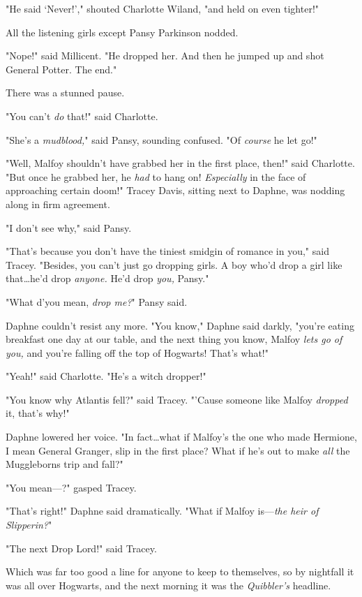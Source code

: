 "He said `Never!'," shouted Charlotte Wiland, "and held on even tighter!"

All the listening girls except Pansy Parkinson nodded.

"Nope!" said Millicent. "He dropped her. And then he jumped up and shot General
Potter. The end."

There was a stunned pause.

"You can't \emph{do} that!" said Charlotte.

"She's a \emph{mudblood,}" said Pansy, sounding confused. "Of \emph{course} he
let go!"

"Well, Malfoy shouldn't have grabbed her in the first place, then!" said
Charlotte. "But once he grabbed her, he \emph{had} to hang on!
\emph{Especially} in the face of approaching certain doom!" Tracey Davis,
sitting next to Daphne, was nodding along in firm agreement.

"I don't see why," said Pansy.

"That's because you don't have the tiniest smidgin of romance in you," said
Tracey. "Besides, you can't just go dropping girls. A boy who'd drop a girl
like that…he'd drop \emph{anyone.} He'd drop \emph{you,} Pansy."

"What d'you mean, \emph{drop me?}" Pansy said.

Daphne couldn't resist any more. "You know," Daphne said darkly, "you're eating
breakfast one day at our table, and the next thing you know, Malfoy \emph{lets
go of you,} and you're falling off the top of Hogwarts! That's what!"

"Yeah!" said Charlotte. "He's a witch dropper!"

"You know why Atlantis fell?" said Tracey. "'Cause someone like Malfoy
\emph{dropped} it, that's why!"

Daphne lowered her voice. "In fact…what if Malfoy's the one who made
Hermione, I mean General Granger, slip in the first place? What if he's out to
make \emph{all} the Muggleborns trip and fall?"

"You mean---?" gasped Tracey.

"That's right!" Daphne said dramatically. "What if Malfoy is---\emph{the heir
of Slipperin?}"

"The next Drop Lord!" said Tracey.

Which was far too good a line for anyone to keep to themselves, so by nightfall
it was all over Hogwarts, and the next morning it was the \emph{Quibbler's}
headline.

